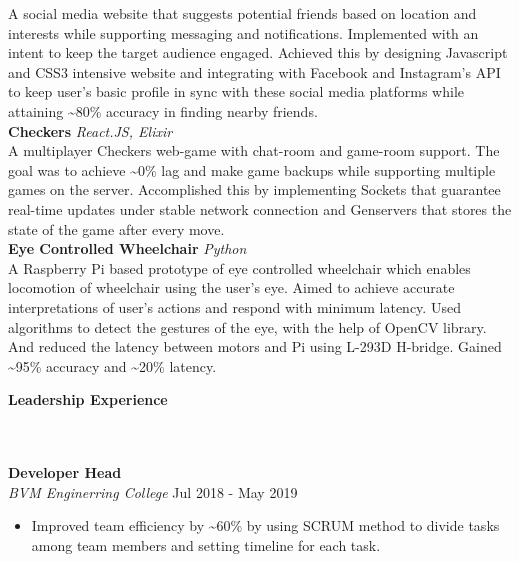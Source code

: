 \documentclass[]{article}
\newcommand{\lineunder} {
    \vspace*{-8pt} \\
    \hrulefill \\
}
\newcommand{\header} [1] {
    {\vspace*{6pt} \fontsize{12}{12}\selectfont \textbf{#1}}
     \lineunder
}
\begin{document}
{\addtolength{\leftskip}{2mm}
A social media website that suggests potential friends based on location and
interests while supporting messaging and notifications. Implemented with an
intent to keep the target audience engaged. Achieved this by designing
Javascript and CSS3 intensive website and integrating with Facebook and
Instagram's API to keep user's basic profile in sync with these social media
platforms while attaining \textasciitilde{}80\% accuracy in finding nearby
friends. \\}
\vspace*{2mm}
{\hspace{2mm}\textbf{Checkers}} {\sl React.JS, Elixir} \\
{\addtolength{\leftskip}{2mm}
A multiplayer Checkers web-game with chat-room and game-room support. The goal
was to achieve \textasciitilde{}0\% lag and make game backups while supporting
multiple games on the server. Accomplished this by implementing Sockets that
guarantee real-time updates under stable network connection and Genservers that
stores the state of the game after every move. \\
}
\vspace*{2mm}
{\hspace{2mm}\textbf{Eye Controlled Wheelchair}} {\sl Python} \\
{\addtolength{\leftskip}{2mm}
A Raspberry Pi based prototype of eye controlled wheelchair which enables
locomotion of wheelchair using the user's eye. Aimed to achieve accurate
interpretations of user's actions and respond with minimum latency. Used
algorithms to detect the gestures of the eye, with the help of OpenCV library.
And reduced the latency between motors and Pi using L-293D H-bridge. Gained
\textasciitilde{}95\% accuracy and \textasciitilde{}20\% latency.\\
}
\vspace*{2mm}

\header{Leadership Experience}
\hspace{1mm}
\textbf{Developer Head}\\ 
\hspace{1mm}
\textit{BVM Enginerring College} \hfill Jul 2018 - May 2019\\
\vspace{-2mm}
\begin{itemize}
	\setlength\itemsep{0.2mm}
		\item Improved team efficiency by \textasciitilde{}60\% by using SCRUM method to divide tasks among team members and setting timeline for each task.
\end{itemize}
\vspace*{2mm}

\ 
\end{document}
